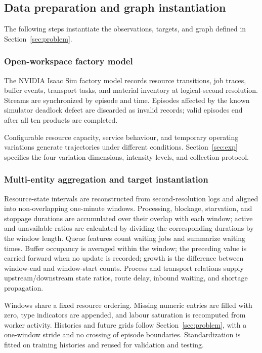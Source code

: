 \documentclass[a4paper,fleqn]{cas-dc}
\begin{document}
\subsection{Data preparation and graph instantiation}

The following steps instantiate the observations, targets, and graph defined in Section~\ref{sec:problem}.

\subsubsection{Open-workspace factory model}

The NVIDIA Isaac Sim factory model records resource transitions, job traces, buffer events, transport tasks, and material inventory at logical-second resolution. Streams are synchronized by episode and time. Episodes affected by the known simulator deadlock defect are discarded as invalid records; valid episodes end after all ten products are completed.

Configurable resource capacity, service behaviour, and temporary operating variations generate trajectories under different conditions. Section~\ref{sec:exp} specifies the four variation dimensions, intensity levels, and collection protocol.

\subsubsection{Multi-entity aggregation and target instantiation}

Resource-state intervals are reconstructed from second-resolution logs and aligned into non-overlapping one-minute windows. Processing, blockage, starvation, and stoppage durations are accumulated over their overlap with each window; active and unavailable ratios are calculated by dividing the corresponding durations by the window length. Queue features count waiting jobs and summarize waiting times. Buffer occupancy is averaged within the window; the preceding value is carried forward when no update is recorded; growth is the difference between window-end and window-start counts. Process and transport relations supply upstream/downstream state ratios, route delay, inbound waiting, and shortage propagation.

Windows share a fixed resource ordering. Missing numeric entries are filled with zero, type indicators are appended, and labour saturation is recomputed from worker activity. Histories and future grids follow Section~\ref{sec:problem}, with a one-window stride and no crossing of episode boundaries. Standardization is fitted on training histories and reused for validation and testing.
\end{document}

